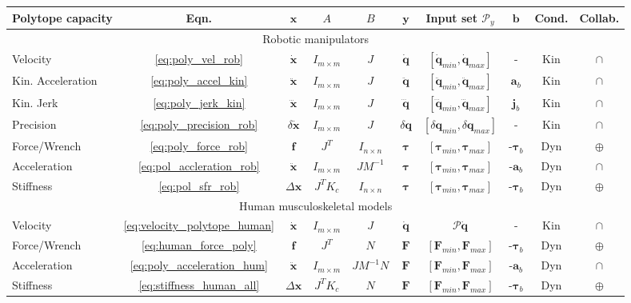 \begin{table}[!b]
\centering
\begin{tabular}{|l|c|c|c|c|c|c|c|c|c|}
\hline
Polytope capacity & Eqn. & $\bm{x}$ & $A$ & $B$ & $\bm{y}$ & Input set $\mathcal{P}_y$ & $\bm{b}$ & Cond. & Collab. \\
\hline
\multicolumn{10}{c}{Robotic manipulators} \\
\hline
Velocity & \ref{eq:poly_vel_rob}& $\dot{\bm{x}}$ & $I_{m\times m}$ & $J$ & $\dot{\bm{q}}$& $[\dot{\bm{q}}_{min},\dot{\bm{q}}_{max}]$ & - & Kin & $\cap$ \\
Kin. Acceleration & \ref{eq:poly_accel_kin} & $\ddot{\bm{x}}$ & $I_{m\times m}$ & $J$ & $\ddot{\bm{q}}$ & $[\ddot{\bm{q}}_{min},\ddot{\bm{q}}_{max}]$ & $\bm{a}_b$ & Kin & $\cap$ \\
Kin. Jerk &\ref{eq:poly_jerk_kin} & $\dddot{\bm{x}}$ & $I_{m\times m}$ & $J$ & $\dddot{\bm{q}}$& $[\dddot{\bm{q}}_{min},\dddot{\bm{q}}_{max}]$ & $\bm{j}_b$ & Kin & $\cap$ \\
Precision & \ref{eq:poly_precision_rob} & $\delta\dot{\bm{x}}$ & $I_{m\times m}$ & $J$ & $\delta\bm{q}$ &$[\delta{\bm{q}}_{min},\delta{\bm{q}}_{max}]$ & - & Kin & $\cap$ \\
Force/Wrench & \ref{eq:poly_force_rob} & $\bm{f}$ & $J^T$ & $I_{n\times n}$ & $\bm{\tau}$ &$[\bm{\tau}_{min},\bm{\tau}_{max}]$ & -$\bm{\tau}_b$ & Dyn & $\oplus$ \\
Acceleration & \ref{eq:pol_accleration_rob} & $\ddot{\bm{x}}$ & $I_{m\times m}$ & $JM^{-1}$ & $\bm{\tau}$ &$[\bm{\tau}_{min},\bm{\tau}_{max}]$ & -$\bm{a}_b$ & Dyn & $\cap$ \\
Stiffness & \ref{eq:pol_sfr_rob}& $\Delta\bm{x}$ & $J^TK_c$ & $I_{n\times n}$ & $\bm{\tau}$ &$[\bm{\tau}_{min},\bm{\tau}_{max}]$ & -$\bm{\tau}_b$ & Dyn & $\oplus$ \\
\hline
\multicolumn{10}{c}{Human musculoskeletal models} \\
\hline
Velocity &\ref{eq:velocity_polytope_human} & $\dot{\bm{x}}$ & $I_{m\times m}$ & $J$ & $\dot{\bm{q}}$ & $\mathcal{P}{\dot{\bm{q}}}$ & - & Kin & $\cap$ \\
Force/Wrench & \ref{eq:human_force_poly} & $\bm{f}$ & $J^T$ & $N$ & $\bm{F}$ & $[\bm{F}_{min},\bm{F}_{max}]$ & -$\bm{\tau}_b$ & Dyn & $\oplus$ \\
Acceleration & \ref{eq:poly_acceleration_hum} & $\ddot{\bm{x}}$ & $I_{m\times m}$ & $JM^{-1}N$ & $\bm{F}$ & $[\bm{F}_{min},\bm{F}_{max}]$ & -$\bm{a}_b$ & Dyn & $\cap$ \\
Stiffness & \ref{eq:stiffness_human_all} &$\Delta\bm{x}$ & $J^TK_c$ & $N$ & $\bm{F}$ & $[\bm{F}_{min},\bm{F}_{max}]$ & -$\bm{\tau}_b$ & Dyn & $\oplus$ \\

\end{tabular}
\end{table}
